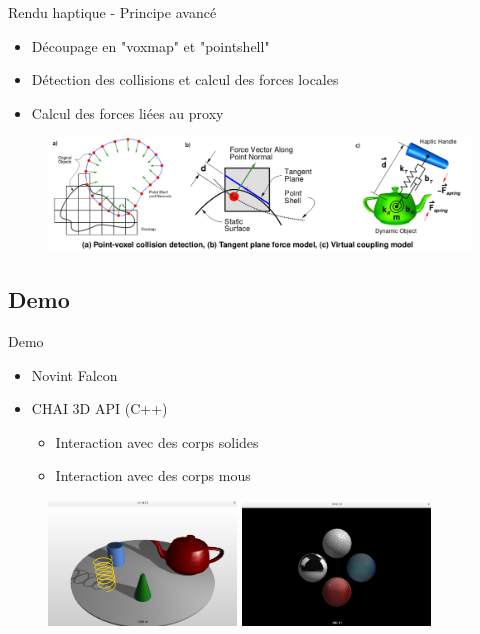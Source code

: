 \documentclass[compress, noflama]{beamer}
\begin{document}
{
\begin{frame}{Rendu haptique - Principe avancé}
\begin{itemize}
\item Découpage en "voxmap" et "pointshell"
\item Détection des collisions et calcul des forces locales
\item Calcul des forces liées au proxy
\end{itemize}
\begin{figure}
\centering
\includegraphics[width=\linewidth]{images/hapticVoxel_corrected}
\end{figure}
\end{frame}
}

\subsection{Demo}
{
\begin{frame}{Demo}
\begin{itemize}
\item Novint Falcon
\item CHAI 3D API (C++)
\begin{itemize}
\item Interaction avec des corps solides
\item Interaction avec des corps mous
\end{itemize}
\end{itemize}
\begin{figure}
\centering
\includegraphics[width=5cm]{images/demo_solides}
\includegraphics[width=5cm]{images/demo_textures}
\end{figure}
\end{frame}
}
\end{document}

